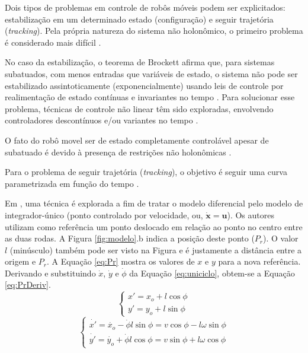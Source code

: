Dois tipos de problemas em controle de robôs móveis podem ser explicitados:
estabilização em um determinado estado (configuração) e seguir trajetória
(\textit{tracking}). Pela própria natureza do sistema não holonômico, o primeiro
problema é considerado mais difícil \cite{tese:franca}.

No caso da estabilização, o teorema de Brockett afirma que, para sistemas
subatuados, com menos entradas que variáveis de estado, o sistema não pode ser
estabilizado assintoticamente (exponencialmente) usando leis de controle por
realimentação de estado contínuas e invariantes no tempo
\cite{artigo:ASTOLFI1995661, inbook:Ravi_Mumbai}.
Para solucionar esse problema, técnicas de controle não linear têm sido
exploradas, envolvendo controladores descontínuos e/ou variantes no tempo
\cite{tese:franca}.  

O fato do robô movel ser de estado completamente controlável
apesar de subatuado é devido à presença de restrições não holonômicas
\cite{Oriolo2013}.

Para o problema de seguir trajetória (\textit{tracking}), o objetivo é seguir
uma curva parametrizada em função do tempo \cite{art:Manuel}. 

Em , uma técnica é explorada a fim de tratar o
modelo diferencial pelo modelo de integrador-único (ponto controlado por
velocidade, ou, $\mathbf{\dot{x}} = \mathbf{u}$). Os autores utilizam como
referência um ponto deslocado em relação ao ponto no centro entre as duas rodas.
A Figura \ref{fig:modelo}.b indica a posição deste ponto ($P_r$). O valor $l$ 
(minúsculo) também pode ser visto na Figura e é justamente a distância entre a 
origem e $P_r$. A Equação \ref{eq:Pr} mostra os valores de $x$ e $y$ para a nova 
referência. Derivando e substituindo $\dot{x}$, $\dot{y}$ e $\dot{\phi}$ da Equação 
\ref{eq:uniciclo}, obtem-se a Equação \ref{eq:PrDeriv}. 
\begin{equation}
	\label{eq:Pr}
	\left \{ \begin{matrix} x' = x_o + l\cos{\phi}
	\\
	y' = y_o + l\sin{\phi}
	\end{matrix} \right.
\end{equation}
\begin{equation}
	\label{eq:PrDeriv}
	\left \{ \begin{matrix} \dot{x'} = \dot{x_o} - \dot{\phi}l\sin{\phi} =
	v\cos{\phi} - l\omega\sin{\phi}
	\\
	\dot{y'} = \dot{y_o} + \dot{\phi}l\cos{\phi} = v\sin{\phi} + l\omega\cos{\phi}
	\end{matrix} \right.
\end{equation}

